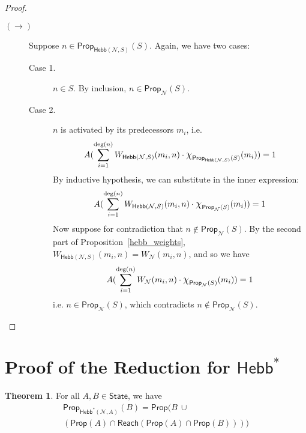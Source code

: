 \documentclass[letterpaper]{article}
\theoremstyle{definition}
\newtheorem{theorem}{Theorem}
\newcommand{\State}{\mathsf{State}}
\newcommand*{\bigchi}{\mbox{\Large$\chi$}}%
\newcommand{\degree}[1]{\mathrm{deg}(#1)}
\newcommand{\Net}{\mathcal{N}}
\newcommand{\Prop}{\mathsf{Prop}}
\newcommand{\Reach}{\mathsf{Reach}}
\newcommand{\Hebb}[2]{\mathsf{Hebb}(#1, #2)}
\newcommand{\Hebbstar}[2]{\mathsf{Hebb}^*(#1, #2)}
\newcommand{\HebbstarNoArgs}{\mathsf{Hebb}^*}
\begin{document}
\begin{proof}
\begin{description}
\begin{description}
            \item[$(\rightarrow)$] Suppose $n \in \Prop_{\Hebb{\Net}{S}}(S)$.  Again, we have two cases:
            \begin{description}
                \item[Case 1.] $n \in S$.  By inclusion, $n \in \Prop_\Net(S)$.
                \item[Case 2.] $n$ is activated by its predecessors $m_i$, i.e.
                \[
                    A(\sum_{i=1}^{\degree{n}} W_{\Hebb{\Net}{S}}(m_i, n) \cdot \bigchi_{\Prop_{\Hebb{\Net}{S}}(S)}(m_i)) = 1
                \]
                By inductive hypothesis, we can substitute in the inner expression:
                \[
                    A(\sum_{i=1}^{\degree{n}} W_{\Hebb{\Net}{S}}(m_i, n) \cdot \bigchi_{\Prop_\Net(S)}(m_i)) = 1
                \]
                Now suppose for contradiction that $n \not \in \Prop_\Net(S)$.  By the second part of Proposition~\ref{hebb_weights}, $W_{\Hebb{\Net}{S}}(m_i, n) = W_\Net(m_i, n)$, and so we have
                \[
                    A(\sum_{i=1}^{\degree{n}} W_\Net(m_i, n) \cdot \bigchi_{\Prop_\Net(S)}(m_i)) = 1
                \]
                i.e. $n \in \Prop_\Net(S)$, which contradicts $n \not \in \Prop_\Net(S)$.
            \end{description}
            
        \end{description}
    \end{description}
\end{proof}

\hebbstarreach*

\hebbstarweights*

\hebbupdatedby*

\section{Proof of the Reduction for $\HebbstarNoArgs$}

\hebbproperties*

\begin{theorem}
    For all $A, B \in \State$, we have
    \begin{multline*}
        \Prop_{\Hebbstar{\Net}{A}}(B) = \Prop(B\ \cup \\
        (\Prop(A) \cap \Reach(\Prop(A) \cap \Prop(B))))
    \end{multline*}
\end{theorem}
\end{document}
